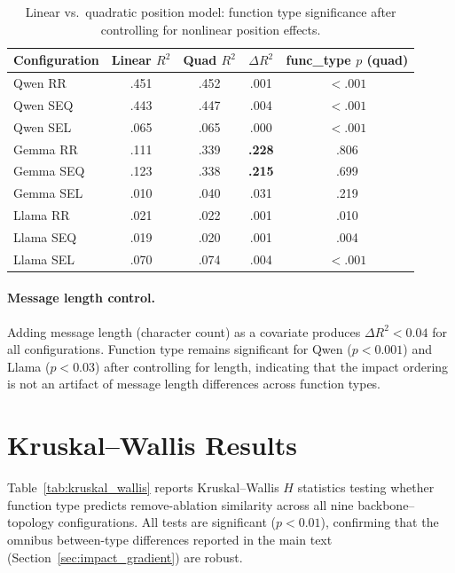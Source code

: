 \begin{table}[htbp]
\centering
\caption{Linear vs.\ quadratic position model: function type significance after controlling for nonlinear position effects.}
\label{tab:nonlinear}
\small
\begin{tabular}{lcccc}
\toprule
\textbf{Configuration} & \textbf{Linear $R^2$} & \textbf{Quad $R^2$} & \textbf{$\Delta R^2$} & \textbf{func\_type $p$ (quad)} \\
\midrule
Qwen RR    & .451 & .452 & .001 & $< .001$ \\
Qwen SEQ   & .443 & .447 & .004 & $< .001$ \\
Qwen SEL   & .065 & .065 & .000 & $< .001$ \\
Gemma RR   & .111 & .339 & \textbf{.228} & .806 \\
Gemma SEQ  & .123 & .338 & \textbf{.215} & .699 \\
Gemma SEL  & .010 & .040 & .031 & .219 \\
Llama RR   & .021 & .022 & .001 & .010 \\
Llama SEQ  & .019 & .020 & .001 & .004 \\
Llama SEL  & .070 & .074 & .004 & $< .001$ \\
\bottomrule
\end{tabular}
\end{table}

\paragraph{Message length control.} Adding message length (character count) as a covariate produces $\Delta R^2 < 0.04$ for all configurations. Function type remains significant for Qwen ($p < 0.001$) and Llama ($p < 0.03$) after controlling for length, indicating that the impact ordering is not an artifact of message length differences across function types.

\section{Kruskal--Wallis Results}
\label{app:kw}

Table~\ref{tab:kruskal_wallis} reports Kruskal--Wallis $H$ statistics testing whether function type predicts remove-ablation similarity across all nine backbone--topology configurations. All tests are significant ($p < 0.01$), confirming that the omnibus between-type differences reported in the main text (Section~\ref{sec:impact_gradient}) are robust.

